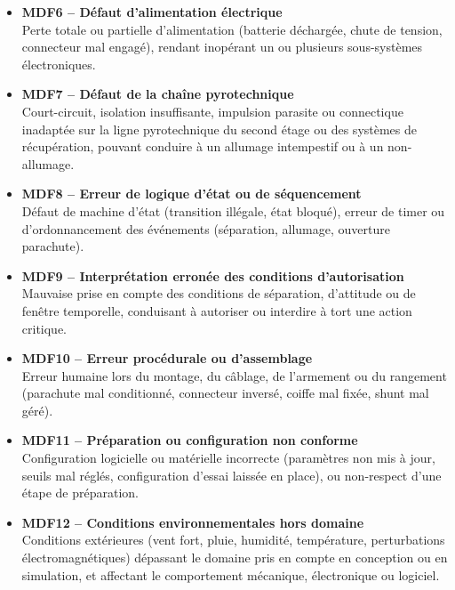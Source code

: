 \begin{itemize}
    \item \textbf{\acrshort{MDF}6 – Défaut d’alimentation électrique} \\
    Perte totale ou partielle d’alimentation (batterie déchargée, chute de tension, connecteur mal engagé), rendant inopérant un
    ou plusieurs sous-systèmes électroniques.\\

    \item \textbf{\acrshort{MDF}7 – Défaut de la chaîne pyrotechnique} \\
    Court-circuit, isolation insuffisante, impulsion parasite ou connectique inadaptée sur la ligne pyrotechnique du second étage
    ou des systèmes de récupération, pouvant conduire à un allumage intempestif ou à un non-allumage.\\

    \item \textbf{\acrshort{MDF}8 – Erreur de logique d’état ou de séquencement} \\
    Défaut de machine d’état (transition illégale, état bloqué), erreur de timer ou d’ordonnancement des événements (séparation,
    allumage, ouverture parachute).\\

    \item \textbf{\acrshort{MDF}9 – Interprétation erronée des conditions d’autorisation} \\
    Mauvaise prise en compte des conditions de séparation, d’attitude ou de fenêtre temporelle, conduisant à autoriser ou
    interdire à tort une action critique.\\

    \item \textbf{\acrshort{MDF}10 – Erreur procédurale ou d’assemblage} \\
    Erreur humaine lors du montage, du câblage, de l’armement ou du rangement (parachute mal conditionné, connecteur inversé,
    coiffe mal fixée, shunt mal géré).\\

    \item \textbf{\acrshort{MDF}11 – Préparation ou configuration non conforme} \\
    Configuration logicielle ou matérielle incorrecte (paramètres non mis à jour, seuils mal réglés, configuration d’essai
    laissée en place), ou non-respect d’une étape de préparation.\\

    \item \textbf{\acrshort{MDF}12 – Conditions environnementales hors domaine} \\
    Conditions extérieures (vent fort, pluie, humidité, température, perturbations électromagnétiques) dépassant le domaine pris
    en compte en conception ou en simulation, et affectant le comportement mécanique, électronique ou logiciel.
\end{itemize}

